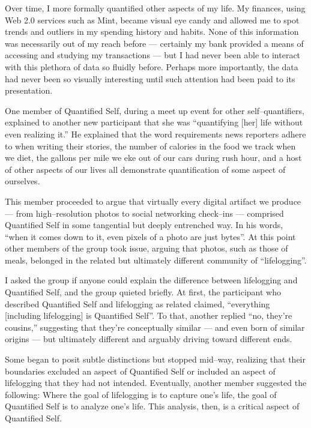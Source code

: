 \documentclass{article}
\begin{document}
Over time,
I more formally quantified other aspects of my life.
My finances,
using Web 2.0 services such as Mint,
became visual eye candy and allowed me to spot trends and outliers in my spending history and habits.
None of this information was necessarily out of my reach before
--- certainly my bank provided a means of accessing and studying my transactions ---
but I had never been able to interact with this plethora of data so fluidly before.
Perhaps more importantly,
the data had never been so visually interesting until such attention had been paid to its presentation.

One member of Quantified Self,
during a meet up event for other self--quantifiers,
explained to another new participant that she was ``quantifying [her] life without even realizing it.'' He explained that the word requirements news reporters adhere to when writing their stories,
the number of calories in the food we track when we diet,
the gallons per mile we eke out of our cars during rush hour,
and a host of other aspects of our lives all demonstrate quantification of some aspect of ourselves.

This member proceeded to argue that virtually every digital artifact we produce
--- from high--resolution photos to social networking check--ins ---
comprised Quantified Self in some tangential but deeply entrenched way.
In his words,
``when it comes down to it,
even pixels of a photo are just bytes''.
At this point other members of the group took issue,
arguing that photos,
such as those of meals,
belonged in the related but ultimately different community of ``lifelogging''.

I asked the group if anyone could explain the difference between lifelogging and Quantified Self,
and the group quieted briefly.
At first,
the participant who described Quantified Self and lifelogging as related claimed,
``everything [including lifelogging] is Quantified Self''.
To that,
another replied ``no, they're cousins,'' suggesting that they're conceptually similar
--- and even born of similar origins ---
but ultimately different and arguably driving toward different ends.

Some began to posit subtle distinctions but stopped mid--way,
realizing that their boundaries excluded an aspect of Quantified Self or included an aspect of lifelogging that they had not intended.
Eventually,
another member suggested the following:
Where the goal of lifelogging is to capture one's life,
the goal of Quantified Self is to analyze one's life.
This analysis,
then,
is a critical aspect of Quantified Self.
\end{document}
